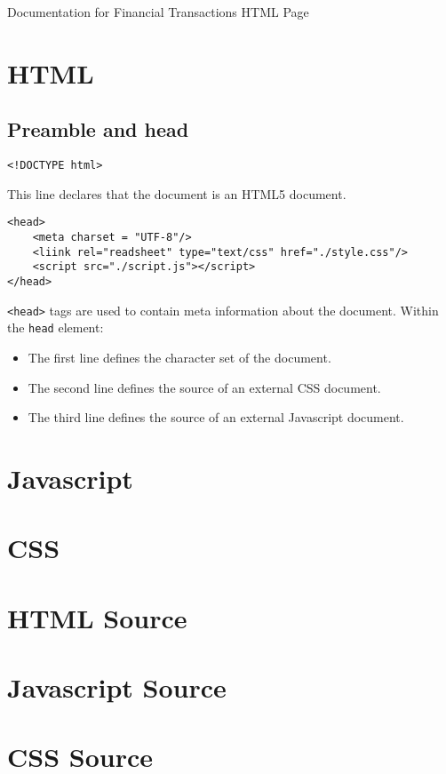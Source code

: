 \documentclass[letterpaper]{article}
\begin{document}
\vspace*{\fill}
\begin{center}
    \Large
    Documentation for Financial Transactions HTML Page
\end{center}
\vspace*{\fill}

\newpage
{}
\tableofcontents

\newpage
{}

\section{HTML}

\subsection{Preamble and head}

\begin{lstlisting}
<!DOCTYPE html>
\end{lstlisting}

This line declares that the document is an HTML5 document.

\begin{lstlisting}
<head>
    <meta charset = "UTF-8"/>
    <liink rel="readsheet" type="text/css" href="./style.css"/>
    <script src="./script.js"></script>
</head>
\end{lstlisting}

\lstinline{<head>} tags are used to contain meta information about the document.
Within the \lstinline{head} element:
\begin{itemize}
    \item The first line defines the character set of the document.
    \item The second line defines the source of an external CSS document.
    \item The third line defines the source of an external Javascript document.
\end{itemize}

\newpage

\section{Javascript}

\newpage

\section{CSS}

\newpage

\appendix
\section{HTML Source}


\newpage

\section{Javascript Source}


\newpage

\section{CSS Source}

\end{document}

